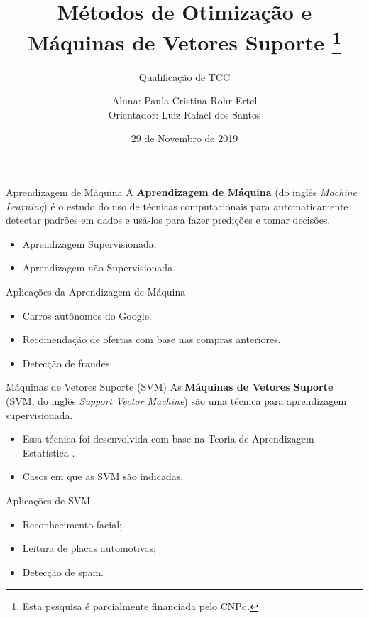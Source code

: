 \documentclass{beamer}
\title[Métodos de Otimização e SVM]{Métodos de Otimização e Máquinas de Vetores Suporte \thanks{Esta pesquisa é parcialmente financiada pelo CNPq.}}
\subtitle{Qualificação de TCC}
\author[Paula Ertel]{Aluna: Paula Cristina Rohr Ertel \\ Orientador: Luiz Rafael dos Santos }
\institute[UFSC]{Universidade Federal de Santa Catarina - Campus Blumenau}
\date{29 de Novembro de 2019}
\theoremstyle{definition}%
\begin{document}
\begin{frame}
	\maketitle
\end{frame}


\begin{frame}{Aprendizagem de Máquina}
A \textbf{Aprendizagem de Máquina} (do inglês \textit{Machine Learning}) é o estudo do uso de técnicas computacionais para automaticamente detectar padrões em dados e usá-los para fazer predições e tomar decisões.
	\begin{itemize}
		\item Aprendizagem Supervisionada.
		\item Aprendizagem não Supervisionada.	
	\end{itemize}
\begin{block}{Aplicações da Aprendizagem de Máquina}
	\begin{itemize} %
		\item Carros autônomos do Google.
		\item Recomendação de ofertas com base nas compras anteriores.
		\item Detecção de fraudes.
	\end{itemize}
\end{block}
\end{frame}


\begin{frame}{Máquinas de Vetores Suporte (SVM)}
 As \textbf{Máquinas de Vetores Suporte} (SVM, do inglês \textit{Support Vector Machine}) são uma técnica para aprendizagem supervisionada.
 \begin{itemize}

	\item Essa técnica foi desenvolvida com base na Teoria de Aprendizagem Estatística \cite{Evelin2017} . 

	\item Casos em que as SVM são indicadas.
\end{itemize}
\begin{block}{Aplicações de SVM}
	\begin{itemize}
	\item Reconhecimento facial; 
	\item Leitura de placas automotivas; 
	\item Detecção de spam.
	\end{itemize}
\end{block}
\end{frame}
\end{document}
